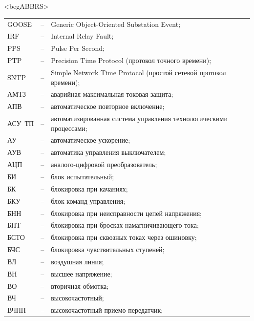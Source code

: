 \color{unimain}\section*{}
{\color{white}\fontsize{0.1pt}{0.1pt}\selectfont<begABBRS>}
\color{black}
\begin{longtable}{>{\raggedright\arraybackslash}m{2cm}>{\raggedright\arraybackslash}m{0.5cm}>{\raggedright\arraybackslash}m{20cm}}
\endfirsthead\endhead\endfoot\endlastfoot
GOOSE & -- & Generic Object-Oriented Substation Event; \\
IRF & -- & Internal Relay Fault; \\
PPS & -- & Pulse Per Second; \\
PTP & -- & Precision Time Protocol (протокол точного времени); \\
SNTP & -- & Simple Network Time Protocol (простой сетевой протокол времени); \\
АМТЗ & -- & аварийная максимальная токовая защита; \\
АПВ & -- & автоматическое повторное включение; \\
АСУ~ТП & -- & автоматизированная система управления технологическими процессами; \\
АУ & -- & автоматическое ускорение; \\
АУВ & -- & автоматика управления выключателем; \\
АЦП & -- & аналого-цифровой преобразователь; \\
БИ & -- & блок испытательный; \\
БК & -- & блокировка при качаниях; \\
БКУ & -- & блок команд управления; \\
БНН & -- & блокировка при неисправности цепей напряжения; \\
БНТ & -- & блокировка при бросках намагничивающего тока; \\
БСТО & -- & блокировка при сквозных токах через ошиновку; \\
БЧС & -- & блокировка чувствительных ступеней; \\
ВЛ & -- & воздушная линия; \\
ВН & -- & высшее напряжение; \\
ВО & -- & вторичная обмотка; \\
ВЧ & -- & высокочастотный; \\
ВЧПП & -- & высокочастотный приемо-передатчик; \\

\end{longtable}
